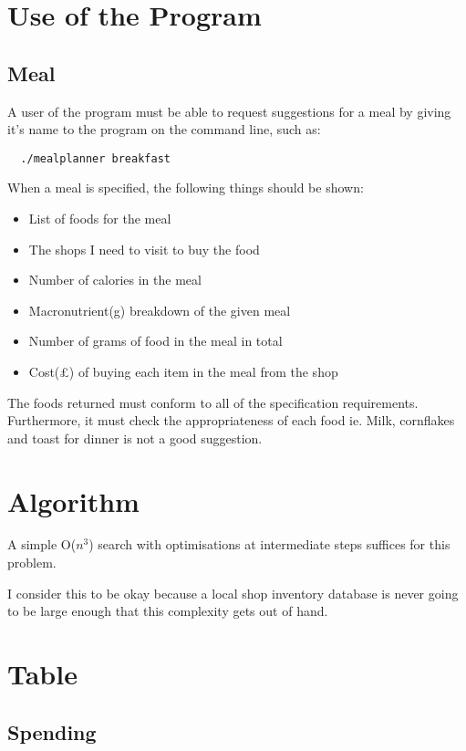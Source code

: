 \documentclass[a4paper]{article}
\begin{document}
\section{Use of the Program}

\subsection{Meal}

A user of the program must be able to request suggestions for a meal by giving it's name 
to the program on the command line, such as:

\begin{verbatim}
  ./mealplanner breakfast
\end{verbatim}

When a meal is specified, the following things should be shown:

\begin{itemize}
  \item List of foods for the meal
  \item The shops I need to visit to buy the food
  \item Number of calories in the meal
  \item Macronutrient(g) breakdown of the given meal
  \item Number of grams of food in the meal in total
  \item Cost(£) of buying each item in the meal from the shop
\end{itemize}

The foods returned must conform to all of the specification 
requirements. Furthermore, it must check the appropriateness of each 
food ie. Milk, cornflakes and toast for dinner is not a good suggestion.

\section{Algorithm}

A simple O($n^{3}$) search with optimisations at intermediate steps suffices 
for this problem.

I consider this to be okay because a local shop inventory database is 
never going to be large enough that this complexity gets out of hand.

\section{Table}

\subsection{Spending}
\end{document}
